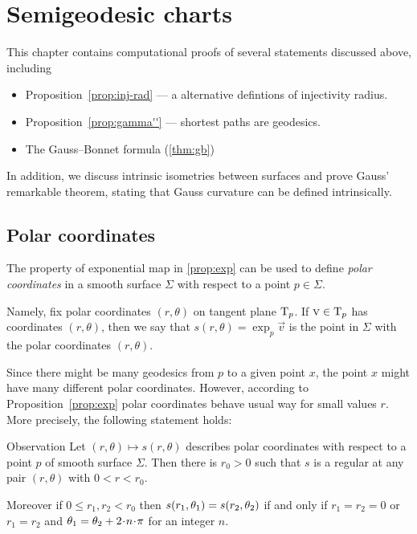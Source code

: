 \chapter{Semigeodesic charts}\label{chap:semigeodesic}

This chapter contains computational proofs of several statements discussed above, including 
\begin{itemize}
\item Proposition~\ref{prop:inj-rad} --- a alternative defintions of injectivity radius.
\item Proposition~\ref{prop:gamma''} --- shortest paths are geodesics.
\item  The Gauss--Bonnet formula (\ref{thm:gb})
\label{sec:proof-of-gamma''}
\end{itemize}
In addition, we discuss intrinsic isometries between surfaces and prove Gauss' remarkable theorem, stating that Gauss curvature can be defined intrinsically.

\section{Polar coordinates}

The property of exponential map in \ref{prop:exp} can be used to define \emph{polar coordinates} in a smooth surface $\Sigma$ with respect to a point $p\in \Sigma$.

Namely, fix polar coordinates $(r,\theta)$ on tangent plane $\mathrm{T}_p$.
If $\textsc v\in \mathrm{T}_p$ has coordinates $(r,\theta)$,
then we say that $s(r,\theta)=\exp_p\vec v$ is the point in $\Sigma$ with the polar coordinates $(r,\theta)$.


Since there might be many geodesics from $p$ to a given point $x$,
the point $x$ might have many different polar coordinates.
However, according to Proposition~\ref{prop:exp} polar coordinates behave usual way for small values $r$.
More precisely, the following statement holds:

\begin{thm}{Observation}\label{obs:polar}
Let $(r,\theta)\mapsto s(r,\theta)$ describes polar coordinates with respect to a point $p$ of smooth surface $\Sigma$.
Then there is $r_0>0$ such that $s$ is a regular at any pair $(r,\theta)$ with $0<r<r_0$.

Moreover if $0\le r_1,r_2<r_0$ then $s(r_1,\theta_1) \z= s(r_2,\theta_2)$ if and only if
$r_1=r_2=0$ or $r_1=r_2$ and $\theta_1\z=\theta_2+2\cdot n\cdot\pi$ for an integer $n$.
\end{thm}

